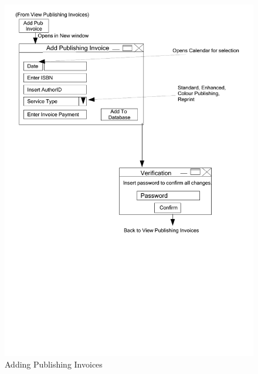 \begin{figure}[H]
    \caption{Adding Publishing Invoices} \label{AddPubInvoice.pdf}
    \includegraphics[width=\textwidth]{./Design/UserInterfaceDesign/AddPubInvoice.pdf}
\end{figure}

